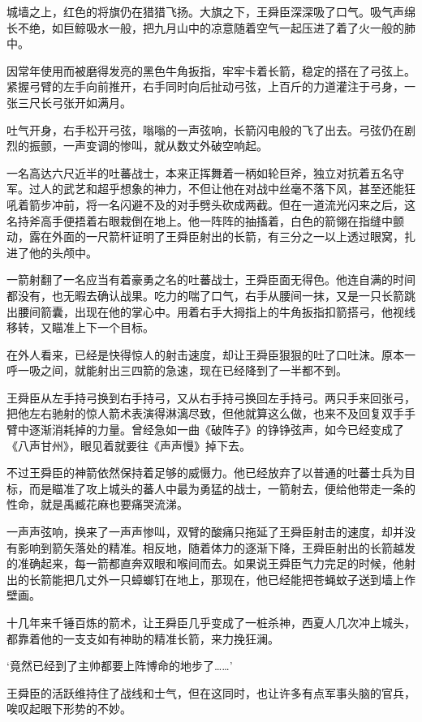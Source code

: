 城墙之上，红色的将旗仍在猎猎飞扬。大旗之下，王舜臣深深吸了口气。吸气声绵长不绝，如巨鲸吸水一般，把九月山中的凉意随着空气一起压进了着了火一般的肺中。

因常年使用而被磨得发亮的黑色牛角扳指，牢牢卡着长箭，稳定的搭在了弓弦上。紧握弓臂的左手向前推开，右手同时向后扯动弓弦，上百斤的力道灌注于弓身，一张三尺长弓张开如满月。

吐气开身，右手松开弓弦，嗡嗡的一声弦响，长箭闪电般的飞了出去。弓弦仍在剧烈的振颤，一声变调的惨叫，就从数丈外破空响起。

一名高达六尺近半的吐蕃战士，本来正挥舞着一柄如轮巨斧，独立对抗着五名守军。过人的武艺和超乎想象的神力，不但让他在对战中丝毫不落下风，甚至还能狂吼着箭步冲前，将一名闪避不及的对手劈头砍成两截。但在一道流光闪来之后，这名持斧高手便捂着右眼栽倒在地上。他一阵阵的抽搐着，白色的箭翎在指缝中颤动，露在外面的一尺箭杆证明了王舜臣射出的长箭，有三分之一以上透过眼窝，扎进了他的头颅中。

一箭射翻了一名应当有着豪勇之名的吐蕃战士，王舜臣面无得色。他连自满的时间都没有，也无暇去确认战果。吃力的喘了口气，右手从腰间一抹，又是一只长箭跳出腰间箭囊，出现在他的掌心中。用着右手大拇指上的牛角扳指扣箭搭弓，他视线移转，又瞄准上下一个目标。

在外人看来，已经是快得惊人的射击速度，却让王舜臣狠狠的吐了口吐沫。原本一呼一吸之间，就能射出三四箭的急速，现在已经降到了一半都不到。

王舜臣从左手持弓换到右手持弓，又从右手持弓换回左手持弓。两只手来回张弓，把他左右驰射的惊人箭术表演得淋漓尽致，但他就算这么做，也来不及回复双手手臂中逐渐消耗掉的力量。曾经急如一曲《破阵子》的铮铮弦声，如今已经变成了《八声甘州》，眼见着就要往《声声慢》掉下去。

不过王舜臣的神箭依然保持着足够的威慑力。他已经放弃了以普通的吐蕃士兵为目标，而是瞄准了攻上城头的蕃人中最为勇猛的战士，一箭射去，便给他带走一条的性命，就是禹臧花麻也要痛哭流涕。

一声声弦响，换来了一声声惨叫，双臂的酸痛只拖延了王舜臣射击的速度，却并没有影响到箭矢落处的精准。相反地，随着体力的逐渐下降，王舜臣射出的长箭越发的准确起来，每一箭都直奔双眼和喉间而去。如果说王舜臣气力完足的时候，他射出的长箭能把几丈外一只蟑螂钉在地上，那现在，他已经能把苍蝇蚊子送到墙上作壁画。

十几年来千锤百炼的箭术，让王舜臣几乎变成了一桩杀神，西夏人几次冲上城头，都靠着他的一支支如有神助的精准长箭，来力挽狂澜。

‘竟然已经到了主帅都要上阵博命的地步了……’

王舜臣的活跃维持住了战线和士气，但在这同时，也让许多有点军事头脑的官兵，唉叹起眼下形势的不妙。

